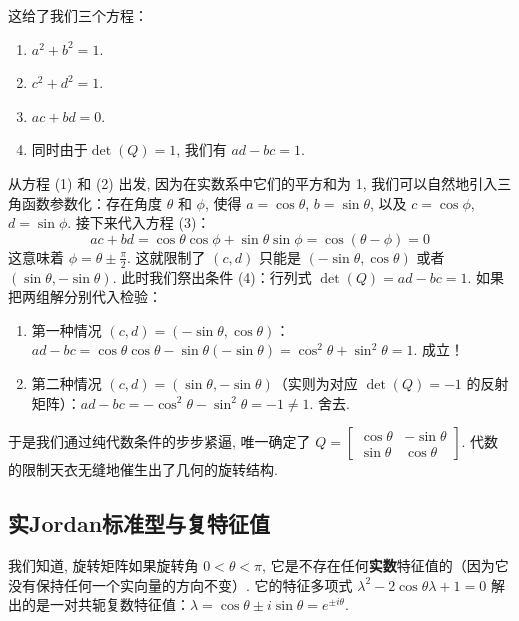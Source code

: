 \documentclass{ctexart}
\begin{document}
这给了我们三个方程：

\begin{enumerate}
    \item $a^2 + b^2 = 1$.
    \item $c^2 + d^2 = 1$.
    \item $ac + bd = 0$.
    \item 同时由于$\det(Q) = 1$, 我们有 $ad - bc = 1$.
\end{enumerate}

从方程 (1) 和 (2) 出发, 因为在实数系中它们的平方和为 1, 我们可以自然地引入三角函数参数化：存在角度 $\theta$ 和 $\phi$, 使得 $a = \cos\theta$, $b = \sin\theta$, 以及 $c = \cos\phi$, $d = \sin\phi$. 
接下来代入方程 (3)：
$$ac + bd = \cos\theta\cos\phi + \sin\theta\sin\phi = \cos(\theta - \phi) = 0$$
这意味着 $\phi = \theta \pm \frac{\pi}{2}$. 这就限制了 $(c, d)$ 只能是 $(-\sin\theta, \cos\theta)$ 或者 $(\sin\theta, -\sin\theta)$. 
此时我们祭出条件 (4)：行列式 $\det(Q) = ad - bc = 1$. 
如果把两组解分别代入检验：

\begin{enumerate}
    \item 第一种情况 $(c, d) = (-\sin\theta, \cos\theta)$：$ad - bc = \cos\theta\cos\theta - \sin\theta(-\sin\theta) = \cos^2\theta + \sin^2\theta = 1$. 成立！
    \item 第二种情况 $(c, d) = (\sin\theta, -\sin\theta)$（实则为对应 $\det(Q)=-1$ 的反射矩阵）：$ad - bc = -\cos^2\theta - \sin^2\theta = -1 \neq 1$. 舍去.
\end{enumerate}

于是我们通过纯代数条件的步步紧逼, 唯一确定了 $Q = \begin{bmatrix} \cos\theta & -\sin\theta \\ \sin\theta & \cos\theta \end{bmatrix}$. 代数的限制天衣无缝地催生出了几何的旋转结构.

\subsection{实Jordan标准型与复特征值}

我们知道, 旋转矩阵如果旋转角 $0 < \theta < \pi$, 它是不存在任何\textbf{实数}特征值的（因为它没有保持任何一个实向量的方向不变）. 它的特征多项式 $\lambda^2 - 2\cos\theta\lambda + 1 = 0$ 解出的是一对共轭复数特征值：$\lambda = \cos\theta \pm i\sin\theta = e^{\pm i\theta}$.
\end{document}
